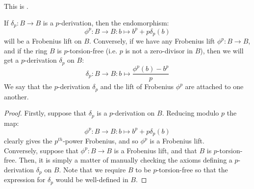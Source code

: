                     \begin{proposition} \label{prop: p_derivations_and_frobenius_lifts}
                        This is \cite[Remark 2.2]{bhatt_scholze_prisms}.
                        
                        If $\delta_p: B \to B$ is a $p$-derivation, then the endomorphism:
                            $$\phi^p: B \to B: b \mapsto b^p + p\delta_p(b)$$
                        will be a Frobenius lift on $B$. Conversely, if we have any Frobenius lift $\phi^p: B \to B$, and if the ring $B$ is $p$-torsion-free (i.e. $p$ is not a zero-divisor in $B$), then we will get a $p$-derivation $\delta_p$ on $B$:
                            $$\delta_p: B \to B: b \mapsto \frac{\phi^p(b) - b^p}{p}$$
                        We say that the $p$-derivation $\delta_p$ and the lift of Frobenius $\phi^p$ are attached to one another.
                    \end{proposition}
                        \begin{proof}
                            Firstly, suppose that $\delta_p$ is a $p$-derivation on $B$. Reducing modulo $p$ the map:
                                $$\phi^p: B \to B: b \mapsto b^p + p\delta_p(b)$$
                            clearly gives the $p^{th}$-power Frobenius, and so $\phi^p$ is a Frobenius lift. 
                            \\
                            Conversely, suppose that $\phi^p: B \to B$ is a Frobenius lift, and that $B$ is $p$-torsion-free. Then, it is simply a matter of manually checking the axioms defining a $p$-derivation $\delta_p$ on $B$. Note that we require $B$ to be $p$-torsion-free so that the expression for $\delta_p$ would be well-defined in $B$.
                        \end{proof}
